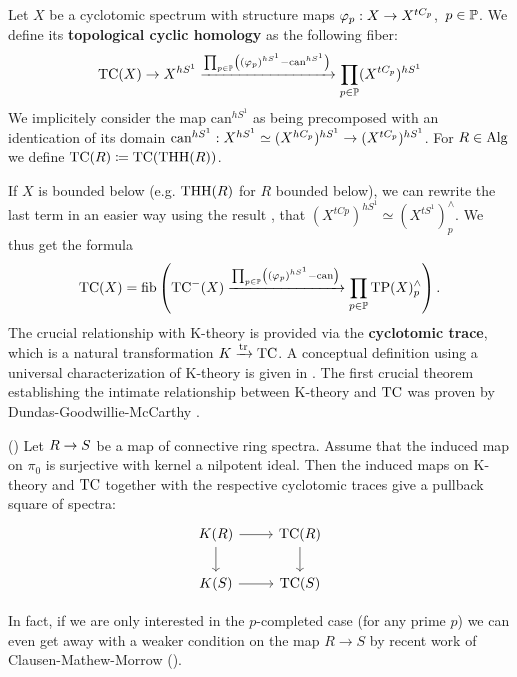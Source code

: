 \begin{defn}
    Let $X$ be a cyclotomic spectrum with structure maps $\varphi_p:X\rightarrow X^{tC_p}$,\ $p\in\mathbb{P}$. We define its \textbf{topological cyclic homology} as the following fiber:
    \begin{equation*}
        \operatorname{TC}(X)\rightarrow X^{hS^1}\xrightarrow{\prod_{p\in\mathbb{P}}\left( (\varphi_p)^{hS^1}-\textrm{can}^{hS^1} \right)}\prod_{p\in\mathbb{P}}(X^{tC_p})^{hS^1} 
    \end{equation*}
    We implicitely consider the map $\textrm{can}^{hS^1}$ as being precomposed with an identication of its domain $\textrm{can}^{hS^1}:X^{hS^1}\simeq (X^{hC_p})^{hS^1}\rightarrow(X^{tC_p})^{hS^1}$.
    For $R\in \operatorname{Alg}$ we define $\operatorname{TC}(R)\coloneqq \operatorname{TC}(\operatorname{THH}(R))$.
\end{defn}
If $X$ is bounded below (e.g. $\operatorname{THH}(R)$ for $R$ bounded below), we can rewrite the last term in an easier way using the result \cite[Lemma~II.4.2]{NS}, that $(X^{tCp})^{hS^1}\simeq (X^{tS^1})_p^{\wedge}$. We thus get the formula
\begin{equation*}
    \operatorname{TC}(X)=\operatorname{fib}\left(  \operatorname{TC}^{-}(X)\xrightarrow{\prod_{p\in\mathbb{P}}\left( (\varphi_p)^{hS^1}-\textrm{can} \right)}\prod_{p\in\mathbb{P}} \operatorname{TP}(X)^{\wedge}_p\right).
\end{equation*}
The crucial relationship with K-theory is provided via the \textbf{cyclotomic trace}, which is a natural transformation $K\xrightarrow{\operatorname{tr}} \operatorname{TC}$. A conceptual definition using a universal characterization of K-theory is given in \cite[Section~10.3]{BGTuniversal}.
The first crucial theorem establishing the intimate relationship between K-theory and $\operatorname{TC}$ was proven by Dundas-Goodwillie-McCarthy .
\begin{thm}(\cite[Theorem~7.2.2.1]{DundasGoodwillieMccarthyLocalstructure})
    Let $R\rightarrow S$ be a map of connective ring spectra. Assume that the induced map on $\pi_0$ is surjective with kernel a nilpotent ideal. Then the induced maps on K-theory and $\operatorname{TC}$ together with the respective cyclotomic traces give a pullback square of spectra:
    \[\begin{tikzcd}
        {K(R)} & {\mathrm{TC}(R)} \\
        {K(S)} & {\mathrm{TC}(S)}
        \arrow[from=1-1, to=1-2]
        \arrow[from=1-2, to=2-2]
        \arrow[from=1-1, to=2-1]
        \arrow[from=2-1, to=2-2]
    \end{tikzcd}\]
\end{thm}
In fact, if we are only interested in the $p$-completed case (for any prime $p$) we can even get away with a weaker condition on the map $R\to S$ by recent work of Clausen-Mathew-Morrow (\cite[Theorem~A]{CMMHenselian}).\\
